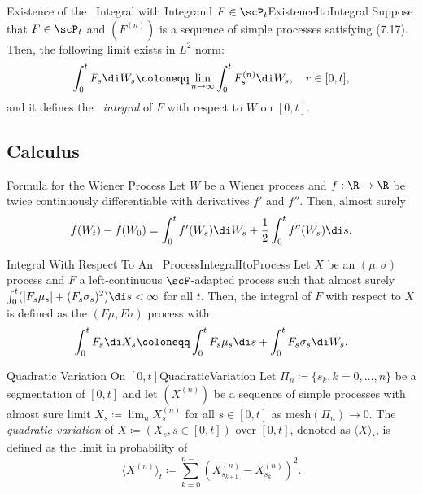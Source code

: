 \begin{thm}{Existence of the \Ito\ Integral with Integrand \(F \in \scP_t\)}{ExistenceItoIntegral}
	Suppose that \(F \in \scP_t\) and \((F^{(n)})\) is a sequence of simple processes satisfying (7.17). Then, the following limit exists in \(L^2\) norm:
	\begin{equation}
		\int_0^t F_s \di W_s \coloneqq \lim_{n \to \infty} \int_0^t F_s^{(n)} \di W_s, \quad r \in [0, t],
		\label{eq:ItoIntegralL2Limit}
	\end{equation}
	and it defines the \textit{\Ito\ integral} of \(F\) with respect to \(W\) on \([0, t]\).
\end{thm}

\subsection{\Ito{} Calculus}
\begin{thm}{\Ito{} Formula for the Wiener Process}{}
	Let \(W\) be a Wiener process and \(f : \R \to \R\) be twice continuously differentiable with derivatives \(f'\) and \(f''\). Then, almost surely
	\begin{equation*}
		f(W_t) - f(W_0) = \int_0^t f'(W_s) \di W_s + \frac{1}{2} \int_0^t f''(W_s) \di s.
	\end{equation*}
\end{thm}

\begin{defn}{Integral With Respect To An \Ito\ Process}{IntegralItoProcess}
	Let \(X\) be an \Ito\((\mu, \sigma)\) process and \(F\) a left-continuous \(\scF\)-adapted process such that almost surely \(\int_{0}^{t}(|F_s\mu_s| + (F_s\sigma_s)^2)\di s < \infty\) for all \(t\). Then, the integral of \(F\) with respect to \(X\) is defined as the \Ito\((F\mu, F\sigma)\) process with:
	\begin{equation}
		\int_{0}^{t} F_s \di X_s \coloneqq \int_{0}^{t} F_s \mu_s \di s + \int_{0}^{t} F_s \sigma_s \di W_s.
	\end{equation}
\end{defn}

\begin{defn}{Quadratic Variation On \([0, t]\)}{QuadraticVariation}
	Let \(\Pi_n \coloneqq \{s_k, k = 0, \dots, n\}\) be a segmentation of \([0, t]\) and let \((X^{(n)})\) be a sequence of simple processes with almost sure limit \(X_s \coloneqq \lim_n X^{(n)}_s\) for all \(s \in [0, t]\) as \(\mathrm{mesh}(\Pi_n) \to 0\). The \textit{quadratic variation} of \(X \coloneqq (X_s, s \in [0, t])\) over \([0, t]\), denoted as \(\langle X \rangle_t\), is defined as the limit in probability of
	\begin{equation}
		\langle X^{(n)} \rangle_t \coloneqq \sum_{k=0}^{n-1} (X^{(n)}_{s_{k+1}} - X^{(n)}_{s_k})^2.
	\end{equation}
\end{defn}

